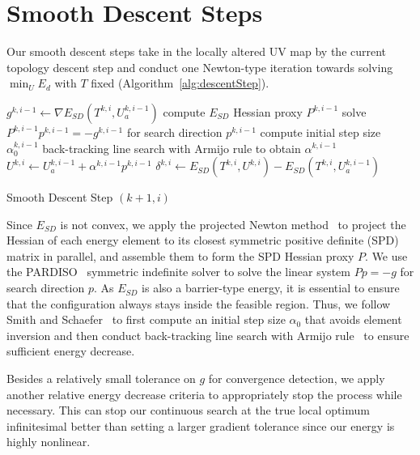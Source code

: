 
\section{Smooth Descent Steps}
\label{sec:descentStep}

Our smooth descent steps take in the locally altered UV map by the current topology descent step and conduct one Newton-type iteration towards solving $\min_U E_d$ with $T$ fixed (Algorithm~\ref{alg:descentStep}).

\begin{algorithm}[h]
\SetAlgoLined
{}
$g^{k,i-1} \leftarrow \nabla E_{SD}(T^{k,i}, U_a^{k,i-1})$\;
compute $E_{SD}$ Hessian proxy $P^{k,i-1}$\;
solve $P^{k,i-1} p^{k,i-1} = -g^{k,i-1}$ for search direction $p^{k,i-1}$\;
compute initial step size $\alpha^{k,i-1}_0$\;
back-tracking line search with Armijo rule to obtain $\alpha^{k,i-1}$\;
$U^{k,i} \leftarrow U_a^{k,i-1} + \alpha^{k,i-1} p^{k,i-1}$\;
$\delta^{k,i} \leftarrow E_{SD}(T^{k,i}, U^{k,i}) - E_{SD}(T^{k,i}, U_a^{k,i-1})$\;
\caption{Smooth Descent Step $(k+1,i)$}
\label{alg:descentStep}
\end{algorithm}
Since $E_{SD}$ is not convex, we apply the projected Newton method~\cite{Teran2005Robust} to project the Hessian of each energy element to its closest symmetric positive definite (SPD) matrix in parallel, and assemble them to form the SPD Hessian proxy $P$. We use the PARDISO~\cite{pardiso-6.0a, pardiso-6.0b} symmetric indefinite solver to solve the linear system $P p = -g$ for search direction $p$.  As $E_{SD}$ is also a barrier-type energy, it is essential to ensure that the configuration always stays inside the feasible region. Thus, we follow Smith and Schaefer~ to first compute an initial step size $\alpha_0$ that avoids element inversion and then conduct back-tracking line search with Armijo rule~\cite{Armijo1966Minimization} to ensure sufficient energy decrease.

Besides a relatively small tolerance on $g$ for convergence detection, we apply another relative energy decrease criteria to appropriately stop the process while necessary.
This can stop our continuous search at the true local optimum infinitesimal better than setting a larger gradient tolerance since our energy is highly nonlinear.


